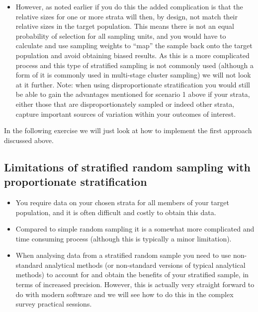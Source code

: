\documentclass[
]{book}
\providecommand{\tightlist}{%
  \setlength{\itemsep}{0pt}\setlength{\parskip}{0pt}}
\begin{document}
\begin{itemize}
\tightlist
\item
  However, as noted earlier if you do this the added complication is that the relative sizes for one or more strata will then, by design, not match their relative sizes in the target population. This means there is not an equal probability of selection for all sampling units, and you would have to calculate and use sampling weights to ``map'' the sample back onto the target population and avoid obtaining biased results. As this is a more complicated process and this type of stratified sampling is not commonly used (although a form of it is commonly used in multi-stage cluster sampling) we will not look at it further. Note: when using disproportionate stratification you would still be able to gain the advantages mentioned for scenario 1 above if your strata, either those that are disproportionately sampled or indeed other strata, capture important sources of variation within your outcomes of interest.
\end{itemize}

In the following exercise we will just look at how to implement the first approach discussed above.

\hypertarget{limitations-of-stratified-random-sampling-with-proportionate-stratification}{%
\subsection{Limitations of stratified random sampling with proportionate stratification}\label{limitations-of-stratified-random-sampling-with-proportionate-stratification}}

\begin{itemize}
\item
  You require data on your chosen strata for all members of your target population, and it is often difficult and costly to obtain this data.
\item
  Compared to simple random sampling it is a somewhat more complicated and time consuming process (although this is typically a minor limitation).
\item
  When analysing data from a stratified random sample you need to use non-standard analytical methods (or non-standard versions of typical analytical methods) to account for and obtain the benefits of your stratified sample, in terms of increased precision. However, this is actually very straight forward to do with modern software and we will see how to do this in the complex survey practical sessions.
\end{itemize}
\end{document}
